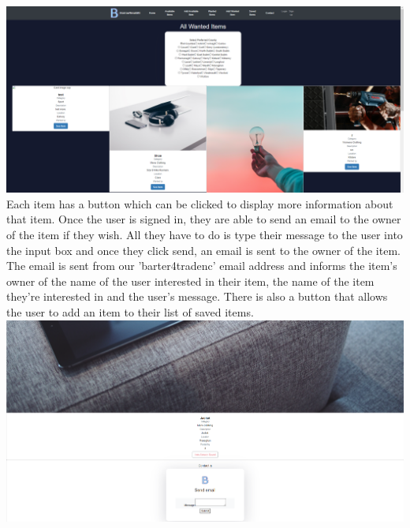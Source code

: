\includegraphics[width=\textwidth]{img/fe_wanteditems.PNG}
\newline
Each item has a button which can be clicked to display more information about that item. Once the user is signed in, they are able to send an email to the owner of the item if they wish. All they have to do is type their message to the user into the input box and once they click send, an email is sent to the owner of the item. The email is sent from our 'barter4tradenc' email address and informs the item's owner of the name of the user interested in their item, the name of the item they're interested in and the user's message. There is also a button that allows the user to add an item to their list of saved items.
\includegraphics[width=\textwidth]{img/fe_itemcontact.PNG}
